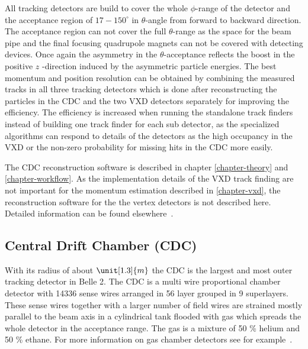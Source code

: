 All tracking detectors are build to cover the whole $\phi$-range of the detector and the acceptance region of $17-150 ^\circ$ in $\theta$-angle from forward to backward direction. The acceptance region can not cover the full $\theta$-range as the space for the beam pipe and the final focusing quadrupole magnets can not be covered with detecting devices. Once again the asymmetry in the $\theta$-acceptance reflects the boost in the positive $z$ -direction induced by the asymmetric particle energies. The best momentum and position resolution can be obtained by combining the measured tracks in all three tracking detectors which is done after reconstructing the particles in the CDC and the two VXD detectors separately for improving the efficiency. The efficiency is increased when running the standalone track finders instead of building one track finder for each sub detector, as the specialized algorithms can respond to details of the detectors as the high occupancy in the VXD or the non-zero probability for missing hits in the CDC more easily. 

The CDC reconstruction software is described in chapter \ref{chapter-theory} and \ref{chapter-workflow}. As the implementation details of the VXD track finding are not important for the momentum estimation described in \ref{chapter-vxd}, the reconstruction software for the the vertex detectors is not described here. Detailed information can be found elsewhere~\cite{jakob}.

\subsection{Central Drift Chamber (CDC)}

With its radius of about $\unit[1.3]{m}$ the CDC is the largest and most outer tracking detector in Belle 2. The CDC is a multi wire proportional chamber detector with 14336 sense wires arranged in 56 layer grouped in 9 superlayers. These sense wires together with a larger number of field wires are strained mostly parallel to the beam axis in a cylindrical tank flooded with gas which spreads the whole detector in the acceptance range. The gas is a mixture of 50 \% helium and 50 \% ethane. For more information on gas chamber detectors see for example~\cite{grupen}.

